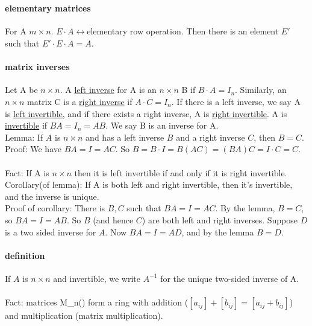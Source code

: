 \documentclass[10pt,letter]{article}
\begin{document}
\section*{}

\paragraph{elementary matrices}
For A $m\times n$. $E\cdot A\leftrightarrow$elementary row operation. Then there is an element $E'$ such that $E'\cdot E\cdot A=A$. \\ 
\paragraph{matrix inverses}
Let A be $n\times n$. A \underline{left inverse} for A is an $n\times n$ B if $B\cdot A=I_n$. Similarly, an $n\times n$ matrix C is a \underline{right inverse} if $A\cdot C=I_n$. If there is a left inverse, we say A is \underline{left invertible}, and if there exists a right inverse, A is \underline{right invertible}. A is \underline{invertible} if $BA=I_n=AB$. We say B is an inverse for A. \\ 
Lemma: If $A$ is $n\times n$ and has a left inverse $B$ and a right inverse $C$, then $B=C$. \\ 
Proof: We have $BA = I = AC$. So $B=B\cdot I=B(AC)=(BA)C=I\cdot C = C$. \\ \\ 
Fact: If A is $n\times n$ then it is left invertible if and only if it is right invertible. \\ 
Corollary(of lemma): If A is both left and right invertible, then it's invertible, and the inverse is unique. \\ 
Proof of corollary: There is $B,C$ such that $BA=I=AC$. By the lemma, $B=C$, so $BA=I=AB$. So $B$ (and hence $C$) are both left and right inverses. Suppose $D$ is a two sided inverse for $A$. Now $BA=I=AD$, and by the lemma $B=D$. 

\paragraph{definition}
If $A$ is $n\times n$ and invertible, we write $A^{-1}$ for the unique two-sided inverse of A. \\ \\ 
Fact: matrices M_{n}() form a ring with addition ($[a_{ij}]+[b_{ij}]=[a_{ij}+b_{ij}]$) and multiplication (matrix multiplication). 
\end{document}
